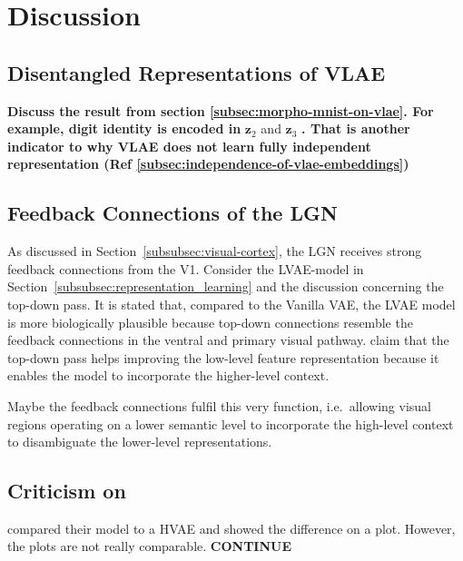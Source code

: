 \documentclass[11pt]{article}
\begin{document}
    \section{Discussion}\label{sec:discussion}

    \subsection{Disentangled Representations of VLAE}
    \textbf{Discuss the result from section \ref{subsec:morpho-mnist-on-vlae}. For example, digit identity is encoded in} $\bm{z}_2$ and $\bm{z}_3$ \textbf{. That is another indicator to why VLAE does not learn fully independent representation (Ref \ref{subsec:independence-of-vlae-embeddings})}

\subsection{Feedback Connections of the \acl{LGN}}\label{subsec:feedback-connections-of-the-lateral-geniculate-nucleus}

As discussed in Section~\ref{subsubsec:visual-cortex}, the \ac{LGN} receives strong feedback connections from the \ac{V1}.
Consider the \ac{LVAE}-model in Section~\ref{subsubsec:representation_learning} and the discussion concerning the top-down pass.
It is stated that, compared to the Vanilla VAE, the \ac{LVAE} model is more biologically plausible because top-down connections resemble the feedback connections in the ventral and primary visual pathway.
\citet{sonderby2016ladder} claim that the top-down pass helps improving the low-level feature representation because it enables the model to incorporate the higher-level context.

Maybe the feedback connections fulfil this very function, i.e.\ allowing visual regions operating on a lower semantic level to incorporate the high-level context to disambiguate the lower-level representations.

    \subsection{Criticism on \citet{zhao2017learning}}

    \citet{zhao2017learning} compared their model to a HVAE and showed the difference on a plot.
    However, the plots are not really comparable.
    \textbf{CONTINUE}
\end{document}

